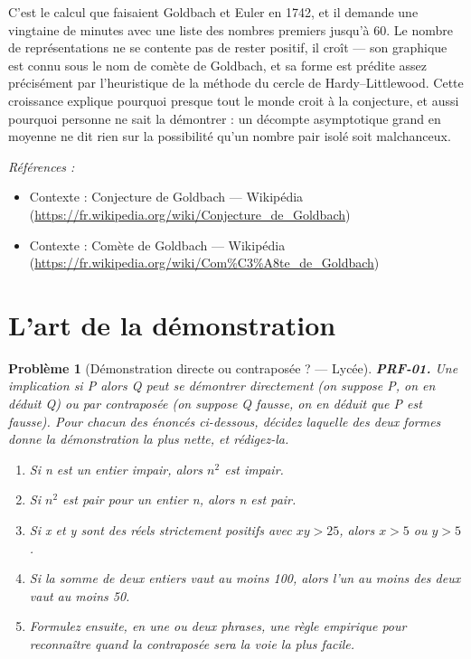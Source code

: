 \documentclass[11pt]{article}
\newtheorem{problem}{Problème}
\newenvironment{refs}{\par\small\noindent\emph{Références :}\begin{itemize}\setlength\itemsep{0pt}}{\end{itemize}\normalsize}
\begin{document}
\noindent C'est le calcul que faisaient Goldbach et Euler en 1742, et il demande
une vingtaine de minutes avec une liste des nombres premiers jusqu'à $ 60 $. Le nombre
de représentations ne se contente pas de rester positif, il croît --- son graphique est
connu sous le nom de comète de Goldbach, et sa forme est prédite assez précisément par
l'heuristique de la méthode du cercle de Hardy--Littlewood. Cette croissance explique
pourquoi presque tout le monde croit à la conjecture, et aussi pourquoi personne ne sait
la démontrer : un décompte asymptotique grand en moyenne ne dit rien sur la possibilité
qu'un nombre pair isolé soit malchanceux.

\begin{refs}
\item Contexte : Conjecture de Goldbach --- Wikipédia (\url{https://fr.wikipedia.org/wiki/Conjecture_de_Goldbach})
\item Contexte : Comète de Goldbach --- Wikipédia (\url{https://fr.wikipedia.org/wiki/Com%C3%A8te_de_Goldbach})
\end{refs}

\bigskip


\section*{L'art de la démonstration}

\begin{problem}[{Démonstration directe ou contraposée ? --- Lycée}]
\textbf{PRF-01.} Une implication \og{} si P alors Q \fg{} peut se démontrer directement
(on suppose P, on en déduit Q) ou par contraposée (on suppose Q fausse, on en déduit que
P est fausse). Pour chacun des énoncés ci-dessous, décidez laquelle des deux formes donne
la démonstration la plus nette, et rédigez-la.
\begin{enumerate}
\item[(a)] Si n est un entier impair, alors $ n^2 $ est impair.
\item[(b)] Si $ n^2 $ est pair pour un entier n, alors n est pair.
\item[(c)] Si x et y sont des réels strictement positifs avec $ xy >25 $, alors $ x >5 $ ou
$ y >5 $.
\item[(d)] Si la somme de deux entiers vaut au moins 100, alors l'un au moins des deux vaut au
moins 50.
\item[(e)] Formulez ensuite, en une ou deux phrases, une règle empirique pour reconnaître quand
la contraposée sera la voie la plus facile.
\end{enumerate}

\end{problem}
\end{document}
